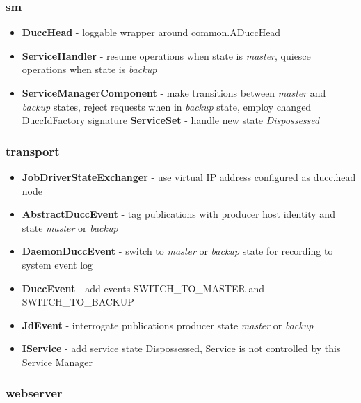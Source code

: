 \documentclass[letterpaper]{article}
\begin{document}
\subsubsection{sm}

{\renewcommand\labelitemi{}
\begin{itemize}
  \item \textbf{DuccHead} - loggable wrapper around common.ADuccHead
  \item \textbf{ServiceHandler} - resume operations when state is {\em master}, quiesce operations when state is {\em backup}
  \item \textbf{ServiceManagerComponent} - make transitions between {\em master} and {\em backup} states, reject requests when in {\em backup} state, employ changed DuccIdFactory signature 
 \textbf{ServiceSet} - handle new state {\em Dispossessed}
\end{itemize}
}

\subsubsection{transport}

{\renewcommand\labelitemi{}
\begin{itemize}
  \item \textbf{JobDriverStateExchanger} - use virtual IP address configured as ducc.head node
  \item \textbf{AbstractDuccEvent} - tag publications with producer host identity and state {\em master} or {\em backup}
  \item \textbf{DaemonDuccEvent} - switch to {\em master} or {\em backup} state for recording to system event log
  \item \textbf{DuccEvent} - add events SWITCH\_TO\_MASTER and SWITCH\_TO\_BACKUP
  \item \textbf{JdEvent} - interrogate publications producer state {\em master} or {\em backup}
  \item \textbf{IService} - add service state Dispossessed, Service is not controlled by this Service Manager
\end{itemize}
}

\subsubsection{webserver}
\end{document}
